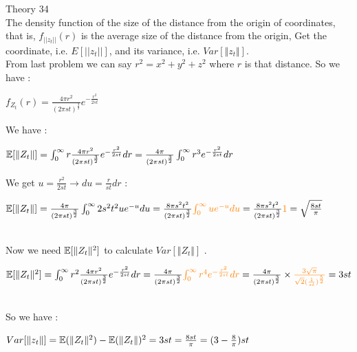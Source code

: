 \documentclass[30pt]{article}
\begin{document}
{\Large \color{blue} Theory 34 } \\
{\color{blue} The density function of the size of the distance from the origin of coordinates, that is, $f_{||z_t||}(r)$ is the average size of the distance from the origin, Get the coordinate, i.e. $E[||z_t||]$, and its variance, i.e. $Var[\Vert z_t \Vert]$.
} \\ \newline 
From last problem we can say $r^2 = x^2+y^2+z^2 $ where $r$ is that distance. So we have : 
\begin{center}
    $f_{Z_t}(r) = \frac{4\pi r^2}{(2\pi st)^{\frac{3}{2}}}e^{-\frac{r^2}{2st}} $ 
\end{center} 
We have : 
\begin{center}
    $\Bbb{E}[\Vert Z_t \Vert ] = \int_{0}^{\infty} r\frac{4\pi r^2}{(2\pi st)^{\frac{3}{2}}}e^{-\frac{r^2}{2st}} dr = \frac{4\pi }{(2\pi st)^{\frac{3}{2}}} \int_{0}^{\infty} r^3 e^{-\frac{r^2}{2st}} dr$
\end{center} 
We get $u = \frac{r^2}{2st} \rightarrow du = \frac{r}{st}dr  $ : \\
\begin{center}
    $\Bbb{E}[\Vert Z_t \Vert ] = \frac{4\pi }{(2\pi st)^{\frac{3}{2}}} \int_{0}^{\infty} 2s^2t^2 ue^{-u} du = \frac{8\pi s^2t^2 }{(2\pi st)^{\frac{3}{2}}} {\color{orange} \int_{0}^{\infty}  ue^{-u} du} = \frac{8\pi s^2t^2 }{(2\pi st)^{\frac{3}{2}}} {\color{orange} 1 }= \sqrt{\frac{8st}{\pi}} $
\end{center} \\
Now we need $ \Bbb{E}[\Vert Z_t \Vert^2 ] $ to calculate $Var[\Vert Z_t \Vert]$ . \\
\begin{center}
    $\Bbb{E}[\Vert Z_t \Vert^2 ] = \int_{0}^{\infty} r^2 \frac{4\pi r^2}{(2\pi st)^{\frac{3}{2}}}e^{-\frac{r^2}{2st}} dr = \frac{4\pi }{(2\pi st)^{\frac{3}{2}}} {\color{orange} \int_{0}^{\infty} r^4 e^{-\frac{r^2}{2st}} dr} = \frac{4\pi }{(2\pi st)^{\frac{3}{2}}} \times {\color{orange} \frac{3\sqrt{\pi}}{\sqrt{2} (\frac{1}{st})^{\frac{5}{2}}} } = 3st $
\end{center} \\
So we have : \\
\begin{center}
    $Var[\Vert z_t \Vert] =\Bbb{E}(\Vert Z_t \Vert^2 ) - \Bbb{E}(\Vert Z_t \Vert )^2 = 3st = \frac{8st}{\pi} = (3 - \frac{8}{\pi})st$
\end{center}
\end{document}
